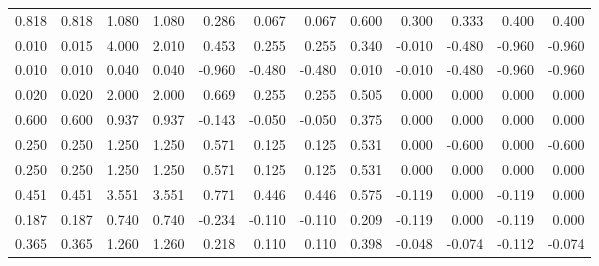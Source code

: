 \documentclass{article}
\begin{document}
\begin{landscape}
\begin{table}
{\begin{tabular}{rrrrrrrrrrrr}
0.818 & 0.818 & 1.080 & 1.080 & 0.286 & 0.067 & 0.067 & 0.600 & 0.300 & 0.333 & 0.400 & 0.400\\
\rowcolor{gray!6}  0.010 & 0.015 & 4.000 & 2.010 & 0.453 & 0.255 & 0.255 & 0.340 & -0.010 & -0.480 & -0.960 & -0.960\\
0.010 & 0.010 & 0.040 & 0.040 & -0.960 & -0.480 & -0.480 & 0.010 & -0.010 & -0.480 & -0.960 & -0.960\\
\rowcolor{gray!6}  0.020 & 0.020 & 2.000 & 2.000 & 0.669 & 0.255 & 0.255 & 0.505 & 0.000 & 0.000 & 0.000 & 0.000\\
0.600 & 0.600 & 0.937 & 0.937 & -0.143 & -0.050 & -0.050 & 0.375 & 0.000 & 0.000 & 0.000 & 0.000\\
\rowcolor{gray!6}  0.250 & 0.250 & 1.250 & 1.250 & 0.571 & 0.125 & 0.125 & 0.531 & 0.000 & -0.600 & 0.000 & -0.600\\
0.250 & 0.250 & 1.250 & 1.250 & 0.571 & 0.125 & 0.125 & 0.531 & 0.000 & 0.000 & 0.000 & 0.000\\
\rowcolor{gray!6}  0.451 & 0.451 & 3.551 & 3.551 & 0.771 & 0.446 & 0.446 & 0.575 & -0.119 & 0.000 & -0.119 & 0.000\\
0.187 & 0.187 & 0.740 & 0.740 & -0.234 & -0.110 & -0.110 & 0.209 & -0.119 & 0.000 & -0.119 & 0.000\\
\rowcolor{gray!6}  0.365 & 0.365 & 1.260 & 1.260 & 0.218 & 0.110 & 0.110 & 0.398 & -0.048 & -0.074 & -0.112 & -0.074\\
\bottomrule
\end{tabular}

}
\end{table}


\end{landscape}
\end{document}
